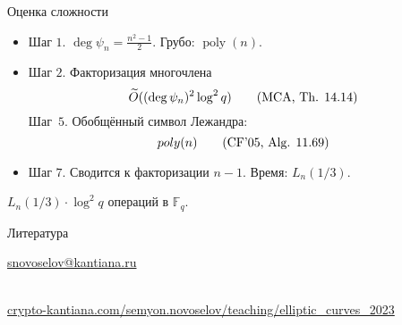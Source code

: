 \documentclass{beamer}
\begin{document}
\begin{frame}{Оценка сложности}
    \begin{itemize}
        \item Шаг $1$. $\deg \psi_n = \frac{n^2 - 1}{2}$. Грубо: $\operatorname{poly}(n)$. \\
        \item Шаг $2$.
        Факторизация многочлена
       	\begin{equation}
       	\widetilde{O}((\deg{\psi_n})^2 \log^2{q}) 	
       	\tag{\text{MCA, Th. 14.14}}
       	\end{equation}
        Шаг~$5$. Обобщённый символ Лежандра:
        \begin{equation}
        	poly(n) 
        	\tag{\text{CF'05, Alg. 11.69}}
        \end{equation}
        \item Шаг $7$. Сводится к факторизации $n-1$. Время: $L_n(1/3)$.
    \end{itemize}
    $L_n({1/3}) \cdot\log^2{q}$ операций в $\mathbb{F}_q$.
\end{frame}


\begin{frame}{Литература}
    \nocite{Washington2008}
    \nocite{Lang1978}
    \nocite{vanTuyl1997}
    \nocite{GathenJurgen2013}
    \nocite{CohenFrey+2005}
    \renewcommand*{\bibfont}{\scriptsize}
    \printbibliography
    
\begin{center}
    \begin{tcolorbox}[enhanced,hbox,colback=block-green-color-bg,colframe=subsection-color!120,title=Контакты,center title]
        \begin{varwidth}{\textwidth}
            \begin{center}
                \href{mailto:snovoselov@kantiana.ru}{snovoselov@kantiana.ru}
            \end{center}
        \end{varwidth}
    \end{tcolorbox}	
\end{center}

\\
{\footnotesize
    \href{https://crypto-kantiana.com/semyon.novoselov/teaching/elliptic_curves_2023}{crypto-kantiana.com/semyon.novoselov/teaching/elliptic\_curves\_2023}
}
\end{frame}
\end{document}
